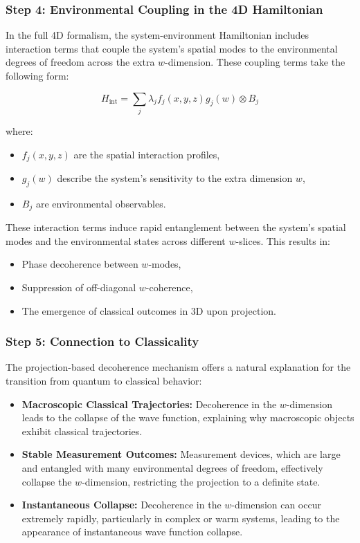 \documentclass[12pt]{article}
\begin{document}
\subsubsection*{Step 4: Environmental Coupling in the 4D Hamiltonian}

In the full 4D formalism, the system-environment Hamiltonian includes interaction terms that couple the system's spatial modes to the environmental degrees of freedom across the extra \( w \)-dimension. These coupling terms take the following form:

\begin{equation}
H_{\text{int}} = \sum_{j} \lambda_j f_j(x, y, z) g_j(w) \otimes B_j
\label{eq:interaction_hamiltonian}
\end{equation}

where:
\begin{itemize}
    \item \( f_j(x, y, z) \) are the spatial interaction profiles,
    \item \( g_j(w) \) describe the system's sensitivity to the extra dimension \( w \),
    \item \( B_j \) are environmental observables.
\end{itemize}

These interaction terms induce rapid entanglement between the system's spatial modes and the environmental states across different \( w \)-slices. This results in:
\begin{itemize}
    \item Phase decoherence between \( w \)-modes,
    \item Suppression of off-diagonal \( w \)-coherence,
    \item The emergence of classical outcomes in 3D upon projection.
\end{itemize}

\subsubsection*{Step 5: Connection to Classicality}

The projection-based decoherence mechanism offers a natural explanation for the transition from quantum to classical behavior:

\begin{itemize}
    \item \textbf{Macroscopic Classical Trajectories:} Decoherence in the \( w \)-dimension leads to the collapse of the wave function, explaining why macroscopic objects exhibit classical trajectories.
    \item \textbf{Stable Measurement Outcomes:} Measurement devices, which are large and entangled with many environmental degrees of freedom, effectively collapse the \( w \)-dimension, restricting the projection to a definite state.
    \item \textbf{Instantaneous Collapse:} Decoherence in the \( w \)-dimension can occur extremely rapidly, particularly in complex or warm systems, leading to the appearance of instantaneous wave function collapse.
\end{itemize}
\end{document}
